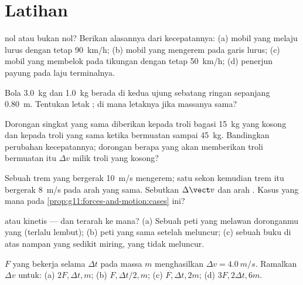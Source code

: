 \section{Latihan}

\begin{exercise}[$\star$]\label{exo:g11:forces-and-motion:1}
 nol atau bukan nol? Berikan alasannya dari kecepatannya:
(a) mobil yang melaju lurus dengan tetap \qty{90}{km/h}; (b) mobil yang
mengerem pada garis lurus; (c) mobil yang membelok pada tikungan dengan
tetap \qty{50}{km/h}; (d) penerjun payung pada laju terminalnya.
\end{exercise}

\begin{exercise}[$\star$]\label{exo:g11:forces-and-motion:2}
Bola \qty{3.0}{kg} dan \qty{1.0}{kg} berada di kedua ujung sebatang
ringan sepanjang \qty{0.80}{m}. Tentukan letak ; di mana
letaknya jika massanya sama?
\end{exercise}

\begin{exercise}[$\star$]\label{exo:g11:forces-and-motion:3}
Dorongan singkat yang sama diberikan kepada troli bagasi \qty{15}{kg}
yang kosong dan kepada troli yang sama ketika bermuatan sampai
\qty{45}{kg}. Bandingkan perubahan kecepatannya; dorongan berapa yang
akan memberikan troli bermuatan itu $\Delta v$ milik troli yang kosong?
\end{exercise}

\begin{exercise}[$\star$]\label{exo:g11:forces-and-motion:4}
Sebuah trem yang bergerak \qty{10}{m/s} mengerem; satu sekon kemudian
trem itu bergerak \qty{8}{m/s} pada arah yang sama. Sebutkan
$\Delta \vect v$ dan arah . Kasus yang mana pada
\cref{prop:g11:forces-and-motion:cases} ini?
\end{exercise}

\begin{exercise}[$\star$]\label{exo:g11:forces-and-motion:5}
 atau kinetis --- dan terarah ke mana? (a) Sebuah peti
yang melawan doronganmu yang (terlalu lembut); (b) peti yang sama
setelah meluncur; (c) sebuah buku di atas nampan yang sedikit miring,
yang tidak meluncur.
\end{exercise}

\begin{exercise}[$\star\star$]\label{exo:g11:forces-and-motion:6}
 $F$ yang bekerja selama $\Delta t$ pada massa $m$
menghasilkan $\Delta v = \qty{4.0}{m/s}$. Ramalkan $\Delta v$ untuk:
(a) $2F, \Delta t, m$; (b) $F, \Delta t/2, m$; (c) $F, \Delta t, 2m$;
(d) $3F, 2\Delta t, 6m$.
\end{exercise}

